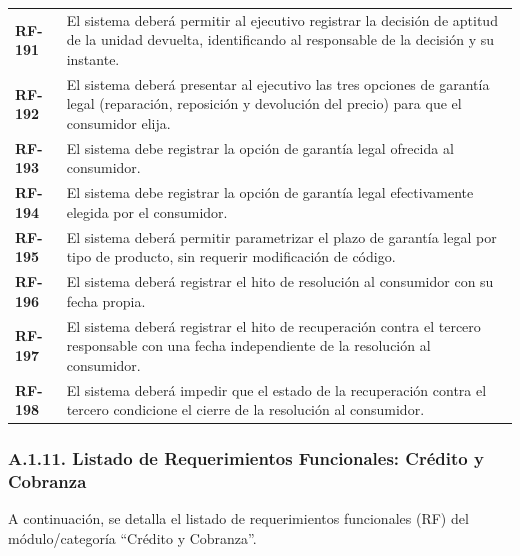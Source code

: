 \documentclass[11pt]{article}
\begin{document}
\begin{longtable}[]{@{}
  >{\raggedright\arraybackslash}p{}
  >{\raggedright\arraybackslash}p{}@{}}
\addlinespace[2pt]
\textbf{RF-191} & El sistema deberá permitir al ejecutivo registrar la decisión de aptitud de la unidad devuelta, identificando al responsable de la decisión y su instante. \\
\addlinespace[2pt]
\textbf{RF-192} & El sistema deberá presentar al ejecutivo las tres opciones de garantía legal (reparación, reposición y devolución del precio) para que el consumidor elija. \\
\addlinespace[2pt]
\textbf{RF-193} & El sistema debe registrar la opción de garantía legal ofrecida al consumidor. \\
\addlinespace[2pt]
\textbf{RF-194} & El sistema debe registrar la opción de garantía legal efectivamente elegida por el consumidor. \\
\addlinespace[2pt]
\textbf{RF-195} & El sistema deberá permitir parametrizar el plazo de garantía legal por tipo de producto, sin requerir modificación de código. \\
\addlinespace[2pt]
\textbf{RF-196} & El sistema deberá registrar el hito de resolución al consumidor con su fecha propia. \\
\addlinespace[2pt]
\textbf{RF-197} & El sistema deberá registrar el hito de recuperación contra el tercero responsable con una fecha independiente de la resolución al consumidor. \\
\addlinespace[2pt]
\textbf{RF-198} & El sistema deberá impedir que el estado de la recuperación contra el tercero condicione el cierre de la resolución al consumidor. \\
\end{longtable}

\subsubsection{A.1.11. Listado de Requerimientos Funcionales: Crédito y Cobranza}\label{a-1-11-listado-de-requerimientos-funcionales-credito-y-cobranza}

A continuación, se detalla el listado de requerimientos funcionales (RF) del módulo/categoría ``Crédito y Cobranza''.
\end{document}
